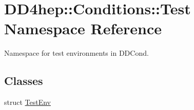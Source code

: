 \hypertarget{namespace_d_d4hep_1_1_conditions_1_1_test}{}\section{D\+D4hep\+:\+:Conditions\+:\+:Test Namespace Reference}
\label{namespace_d_d4hep_1_1_conditions_1_1_test}


Namespace for test environments in D\+D\+Cond.  


\subsection*{Classes}
\begin{DoxyCompactItemize}
\item 
struct \hyperlink{struct_d_d4hep_1_1_conditions_1_1_test_1_1_test_env}{Test\+Env}
\end{DoxyCompactItemize}
